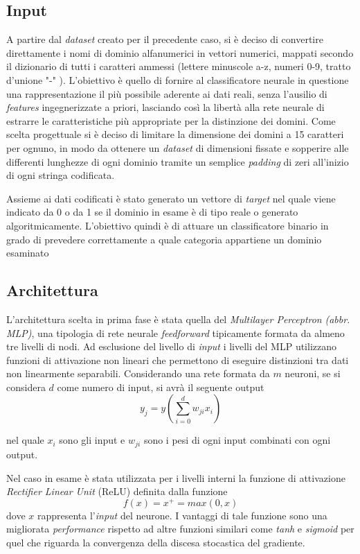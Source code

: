 \subsection{Input}
\label{classificatorenninput}
A partire dal \textit{dataset} creato per il precedente caso, si è deciso di convertire direttamente i nomi di dominio alfanumerici in vettori numerici, mappati secondo il dizionario di tutti i caratteri ammessi \cite{icann} (lettere minuscole a-z, numeri 0-9, tratto d'unione "-" ). L'obiettivo è quello di fornire al classificatore neurale in questione una rappresentazione il più possibile aderente ai dati reali, senza l'ausilio di \textit{features} ingegnerizzate a priori, lasciando così la libertà alla rete neurale di estrarre le caratteristiche più appropriate per la distinzione dei domini. Come scelta progettuale si è deciso di limitare la dimensione dei domini a 15 caratteri per ognuno, in modo da ottenere un \textit{dataset} di dimensioni fissate e sopperire alle differenti lunghezze di ogni dominio tramite un semplice \textit{padding} di zeri all'inizio di ogni stringa codificata.

Assieme ai dati codificati è stato generato un vettore di \textit{target} nel quale viene indicato da 0 o da 1 se il dominio in esame è di tipo reale o generato algoritmicamente. L'obiettivo quindi è di attuare un classificatore binario in grado di prevedere correttamente a quale categoria appartiene un dominio esaminato 

\subsection{Architettura}
\label{classificatorenninterno}
L'architettura scelta in prima fase è stata quella del \textit{Multilayer Perceptron} \textit{(abbr. MLP)}, una tipologia di rete neurale \textit{feedforward} tipicamente formata da almeno tre livelli di nodi. Ad esclusione del livello di \textit{input} i livelli del MLP utilizzano  funzioni di attivazione non lineari che permettono di eseguire distinzioni tra dati non linearmente separabili. Considerando una rete formata da $m$ neuroni,  se si considera $d$ come numero di input, si avrà il seguente output
$$y_j=y\left( \sum_{i=0}^d w_{ji}x_i \right)$$

nel quale $x_i$ sono gli input e $w_{ji}$ sono i pesi di ogni input combinati con ogni output. 


Nel caso in esame è stata utilizzata per i livelli interni la funzione di attivazione \textit{Rectifier Linear Unit} (ReLU) \cite{relu} definita dalla funzione 
$$f(x) = x^+ = max(0,x)$$
dove $x$ rappresenta l'\textit{input} del neurone. 
I vantaggi di tale funzione sono una migliorata \textit{performance} rispetto ad altre funzioni similari come \textit{tanh} e \textit{sigmoid} per quel che riguarda la convergenza della discesa stocastica del gradiente. 

